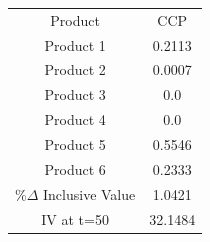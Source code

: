\begin{tabular}{cc}
Product & CCP \\
Product 1 & 0.2113 \\
Product 2 & 0.0007 \\
Product 3 & 0.0 \\
Product 4 & 0.0 \\
Product 5 & 0.5546 \\
Product 6 & 0.2333 \\
$\%\Delta$ Inclusive Value & 1.0421 \\
IV at t=50 & 32.1484 \\
\end{tabular}